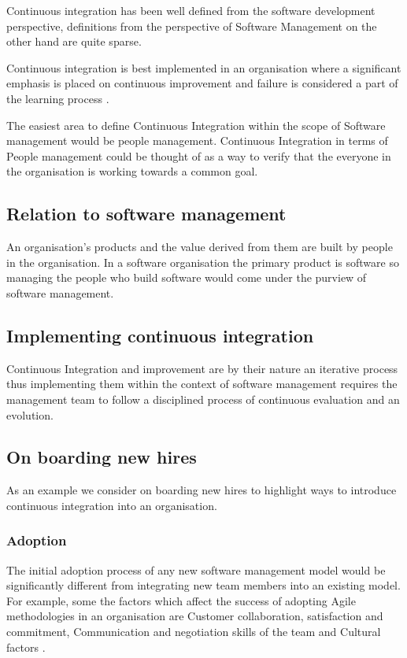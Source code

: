 \documentclass[12pt,conference]{IEEEtran}
\begin{document}
Continuous integration has been well defined from the software development perspective, definitions from the perspective of Software Management on the other hand are quite sparse. 

Continuous integration is best implemented in an organisation where a significant emphasis is placed on continuous improvement and failure is considered a part of the learning process \cite{edmondson_strategies_2011}.

The easiest area to define Continuous Integration within the scope of Software management would be people management. Continuous Integration in terms of People management could be thought of as a way to verify that the everyone in the organisation is working towards a common goal.


\subsection*{Relation to software management}

An organisation's products and the value derived from them are built by people in the organisation. In a software organisation the primary product is software so managing the people who build software would come under the purview of software management. 

\subsection*{Implementing continuous integration}

Continuous Integration and improvement are by their nature an iterative process thus implementing them within the context of software management requires the management team to follow a disciplined process of continuous evaluation and an evolution.

\subsection*{On boarding new hires}

As an example we consider on boarding new hires to highlight ways to introduce continuous integration into an organisation.

\subsubsection*{Adoption}

The initial adoption process of any new software management model would be significantly different from integrating new team members into an existing model. For example, some the factors which affect the success of adopting Agile methodologies in an organisation are 
Customer collaboration, satisfaction and commitment, Communication and negotiation skills of the team and Cultural factors \cite{misra_identifying_2009}.
\end{document}
